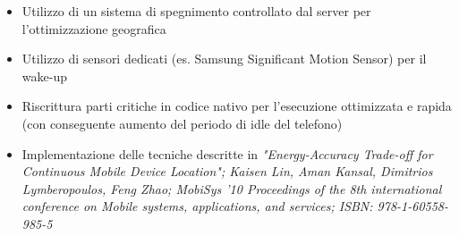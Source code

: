 \documentclass[a4paper,10pt]{memoir}
\begin{document}
\begin{itemize}
\item Utilizzo di un sistema di spegnimento controllato dal server per l'ottimizzazione geografica
\item Utilizzo di sensori dedicati (es. Samsung Significant Motion Sensor) per il wake-up
\item Riscrittura parti critiche in codice nativo per l'esecuzione ottimizzata e rapida (con conseguente aumento del periodo di idle del telefono)
\item Implementazione delle tecniche descritte in \textit{"Energy-Accuracy Trade-off for Continuous Mobile Device Location"; Kaisen Lin, Aman Kansal, Dimitrios Lymberopoulos, Feng Zhao; MobiSys '10 Proceedings of the 8th international conference on Mobile systems, applications, and services; ISBN: 978-1-60558-985-5}
\end{itemize}
\end{document}
